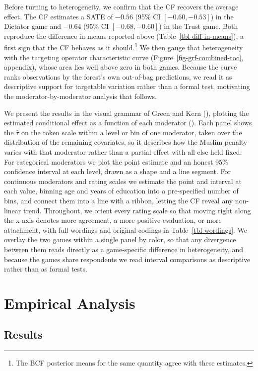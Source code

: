 \documentclass[
  10pt,
  a4paper,
  DIV=11,
  numbers=noendperiod]{scrartcl}
\begin{document}
Before turning to heterogeneity, we confirm that the CF recovers the
average effect. The CF estimates a SATE of \(-0.56\) (95\% CI
\([-0.60, -0.53]\)) in the Dictator game and \(-0.64\) (95\% CI
\([-0.68, -0.60]\)) in the Trust game. Both reproduce the difference in
means reported above (Table~\ref{tbl-diff-in-means}), a first sign that
the CF behaves as it should.\footnote{The BCF posterior means for the
  same quantity agree with these estimates.} We then gauge that
heterogeneity with the targeting operator characteristic curve
(Figure~\ref{fig-grf-combined-toc}, appendix), whose area lies well
above zero in both games. Because the curve ranks observations by the
forest's own out-of-bag predictions, we read it as descriptive support
for targetable variation rather than a formal test, motivating the
moderator-by-moderator analysis that follows.

We present the results in the visual grammar of Green and Kern
(), plotting the estimated
conditional effect as a function of each moderator
(). Each panel shows the
\(\hat{\tau}\) on the token scale within a level or bin of one
moderator, taken over the distribution of the remaining covariates, so
it describes how the Muslim penalty varies with that moderator rather
than a partial effect with all else held fixed. For categorical
moderators we plot the point estimate and an honest 95\% confidence
interval at each level, drawn as a shape and a line segment. For
continuous moderators and rating scales we estimate the point and
interval at each value, binning age and years of education into a
pre-specified number of bins, and connect them into a line with a
ribbon, letting the CF reveal any non-linear trend. Throughout, we
orient every rating scale so that moving right along the x-axis denotes
more agreement, a more positive evaluation, or more attachment, with
full wordings and original codings in Table~\ref{tbl-wordings}. We
overlay the two games within a single panel by color, so that any
divergence between them reads directly as a game-specific difference in
heterogeneity, and because the games share respondents we read interval
comparisons as descriptive rather than as formal tests.

\section{Empirical Analysis}\label{sec-analysis}

\subsection{Results}\label{sec-results}
\end{document}
